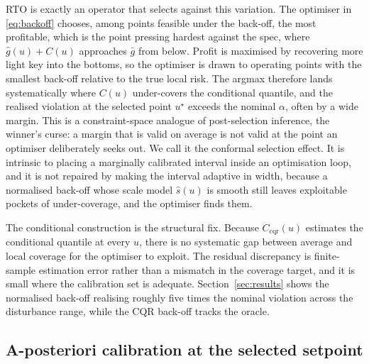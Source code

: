 \documentclass[review,times]{elsarticle}
\begin{document}
RTO is exactly an operator that selects against this variation. The optimiser in
\eqref{eq:backoff} chooses, among points feasible under the back-off, the most profitable,
which is the point pressing hardest against the spec, where $\hat g(u)+C(u)$ approaches $\bar
g$ from below. Profit is maximised by recovering more light key into the bottoms, so the
optimiser is drawn to operating points with the smallest back-off relative to the true local
risk. The argmax therefore lands systematically where $C(u)$ under-covers the conditional
quantile, and the realised violation at the selected point $u^\star$ exceeds the nominal
$\alpha$, often by a wide margin. This is a constraint-space analogue of post-selection
inference, the winner's curse: a margin that is valid on average is not valid at the point an
optimiser deliberately seeks out. We call it the conformal selection effect. It is intrinsic
to placing a marginally calibrated interval inside an optimisation loop, and it is not
repaired by making the interval adaptive in width, because a normalised back-off whose scale
model $\hat s(u)$ is smooth still leaves exploitable pockets of under-coverage, and the
optimiser finds them.

The conditional construction is the structural fix. Because $C_{\mathrm{cqr}}(u)$ estimates
the conditional quantile at every $u$, there is no systematic gap between average and local
coverage for the optimiser to exploit. The residual discrepancy is finite-sample estimation
error rather than a mismatch in the coverage target, and it is small where the calibration
set is adequate. Section~\ref{sec:results} shows the normalised back-off realising roughly
five times the nominal violation across the disturbance range, while the CQR back-off tracks
the oracle.

\subsection{A-posteriori calibration at the selected setpoint}
\label{sec:methods-apost}
\end{document}
